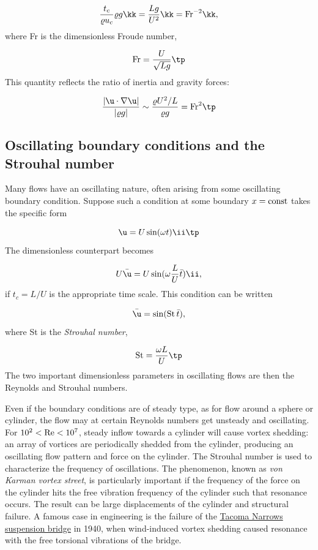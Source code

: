 \documentclass[graybox,envcountchap,sectrefs,final]{svmonodo}
\begin{document}
\[ \frac{t_c}{\varrho  u_c}\varrho g \kk =  \frac{Lg}{U^2}\kk
= \hbox{Fr}^{-2}\kk,\]
where Fr is the dimensionless Froude number,

\[ \hbox{Fr} = \frac{U}{\sqrt{Lg}}\tp\]
This quantity reflects the ratio of inertia and gravity forces:

\[ \frac{|\u\cdot\nabla\u|}{|\varrho g|} \sim \frac{\varrho U^2/L}{\varrho g}
= \hbox{Fr}^2\tp\]


\subsection{Oscillating boundary conditions and the Strouhal number}


Many flows have an oscillating nature, often arising from some
oscillating boundary condition. Suppose such a condition at some
boundary $x=\hbox{const}$ takes the specific form

\[ \u = U\sin(\omega t)\ii\tp\]
The dimensionless counterpart becomes

\[ U\bar\u = U\sin(\omega \frac{L}{U}\bar t)\ii,\]
if $t_c=L/U$ is the appropriate time scale. This condition can be
written

\begin{equation}
\bar\u = \sin(\hbox{St}\,\bar t),
\end{equation}
where St is the \emph{Strouhal number},

\begin{equation}
\hbox{St} = \frac{\omega L}{U}\tp
\end{equation}
The two important dimensionless parameters in oscillating flows are
then the Reynolds and Strouhal numbers.


Even if the boundary conditions
are of steady type, as for flow around a sphere or cylinder,
the flow may at certain Reynolds numbers get unsteady and oscillating.
For $10^2 < \hbox{Re} < 10^7$, steady inflow towards a cylinder will
cause vortex shedding: an array of vortices are periodically shedded
from the cylinder, producing an oscillating flow pattern and force
on the cylinder. The Strouhal number is used to characterize the
frequency of oscillations. The phenomenon, known as \emph{von Karman
vortex street}, is particularly important if the frequency
of the force on the cylinder hits the free vibration frequency
of the cylinder such that resonance occurs. The result can be large
displacements of the cylinder and structural failure. A famous
case in engineering is the failure of the \href{{https://en.wikipedia.org/wiki/Tacoma_Narrows_Bridge_(1940)}}{Tacoma Narrows suspension
bridge}
in 1940, when wind-induced vortex shedding caused resonance
with the free torsional vibrations of the bridge.
\end{document}
